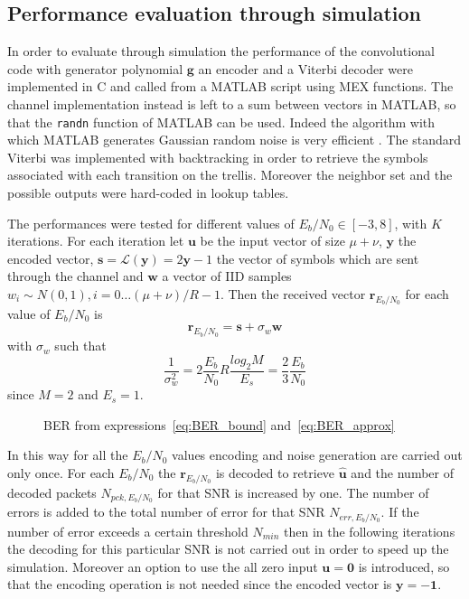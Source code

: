 \documentclass[10pt]{article}
\newlength\fheight
\newlength\fwidth
\begin{document}
\subsection{Performance evaluation through simulation}

In order to evaluate through simulation the performance of the convolutional code with generator polynomial $\mathbf{g}$ an encoder and a Viterbi decoder were implemented in C and called from a MATLAB script using MEX functions. 
The channel implementation instead is left to a sum between vectors in MATLAB, so that the \texttt{randn} function of MATLAB can be used. Indeed the algorithm with which MATLAB generates Gaussian random noise is very efficient \cite{moler}. The standard Viterbi was implemented with backtracking in order to retrieve the symbols associated with each transition on the trellis. Moreover the neighbor set and the possible outputs were hard-coded in lookup tables. 

The performances were tested for different values of $E_b/N_0 \in [-3, 8]$, with $K$ iterations. For each iteration let $\mathbf{u}$ be the input vector of size $\mu + \nu$, $\mathbf{y}$ the encoded vector, $\mathbf{s} = \mathcal{L}(\mathbf{y}) = 2\mathbf{y} - 1$ the vector of symbols which are sent through the channel and $\mathbf{w}$ a vector of IID samples $w_i \sim N(0,1), i = 0 \dots (\mu + \nu)/R - 1$. Then the received vector $\mathbf{r}_{E_b/N_0}$ for each value of $E_b/N_0$ is 
\begin{equation}
	\mathbf{r}_{E_b/N_0} = \mathbf{s} + \sigma_w \mathbf{w}
\end{equation}
with $\sigma_w$ such that
\begin{equation}
	\frac{1}{\sigma_w^2} = 2\frac{E_b}{N_0}R\frac{log_2M}{E_s} = \frac{2}{3} \frac{E_b}{N_0}
\end{equation}
since $M=2$ and $E_s = 1$.


\begin{figure}[t]
\centering
\setlength{}
\setlength{}

\caption{BER from expressions~\eqref{eq:BER_bound} and~\eqref{eq:BER_approx}}
\label{fig:BER_theory}
\end{figure}

In this way for all the $E_b/N_0$ values encoding and noise generation are carried out only once. For each $E_b/N_0$ the $\mathbf{r}_{E_b/N_0}$ is decoded to retrieve $\mathbf{\hat{u}}$ and the number of decoded packets $N_{pck, E_b/N_0}$ for that SNR is increased by one. The number of errors is added to the total number of error for that SNR $N_{err, E_b/N_0}$. If the number of error exceeds a certain threshold $N_{min}$ then in the following iterations the decoding for this particular SNR is not carried out in order to speed up the simulation. Moreover an option to use the all zero input $\mathbf{u} = \mathbf{0}$ is introduced, so that the encoding operation is not needed since the encoded vector is $\mathbf{y} = -\mathbf{1}$. 
\end{document}
